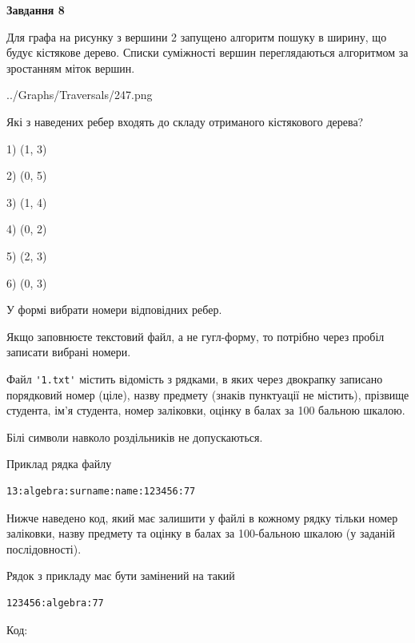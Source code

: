 \documentclass[12pt, ukrainian]{article}
\def\code#1{\Verb!#1!}
\begin{document}
{\begin {large}
{\begin {center}\textbf{Завдання 8}\end {center}}\par
Для графа на рисунку з вершини 2 запущено алгоритм пошуку в ширину, що будує кістякове дерево. Списки суміжності вершин переглядаються алгоритмом за зростанням міток вершин.\par
\begin{center}
	{../Graphs/Traversals/247.png}
\end{center}
\par Які з наведених ребер входять до складу отриманого кістякового дерева?\par
1) (1, 3)\par
2) (0, 5)\par
3) (1, 4)\par
4) (0, 2)\par
5) (2, 3)\par
6) (0, 3)\par
{\vskip 15pt} У формі вибрати номери відповідних ребер.


Якщо заповнюєте текстовий файл, а не гугл-форму, то потрібно через пробіл записа\-ти вибрані номери.\par
\newpage


Файл \code{'1.txt'} містить відомість з рядками, в яких через двокрапку записа\-но поряд\-ковий номер (ціле), назву предмету (знаків пунктуації не містить), прізвище студента, ім'я студента, номер заліковки, оцінку в балах за 100 бальною шкалою.

Білі символи навколо роздільників не допускаються.

Приклад рядка файлу



\begin{verbatim}
13:algebra:surname:name:123456:77
\end{verbatim}


Нижче наведено код, який має залишити у файлі в кожному рядку тільки номер заліковки, назву предмету та оцінку в балах за 100-бальною шкалою (у заданій послі\-дов\-ності).

Рядок з прикладу має бути замінений на такий



\begin{verbatim}
123456:algebra:77
\end{verbatim}




Код:




\end{large}}
\end{document}
